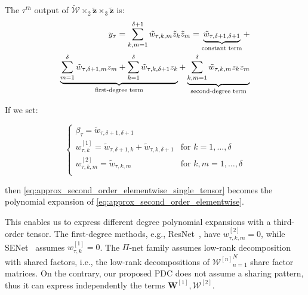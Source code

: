 \documentclass[runningheads]{llncs}
\newcommand{\resnet}{ResNet}
\newcommand{\sne}{SENet}
\newcommand{\noshare}{PDC}
\providecommand{\bmcal}[1]{\bm{\mathcal{#1}}}
\providecommand{\invar}{z}
\providecommand{\binvar}{\bm{\invar}}
\begin{document}
The $\tau^{th}$ output of  $\tilde{\bmcal{W}}\times_{2} \tilde{\binvar} \times_{3} \tilde{\binvar}$ is:
\begin{equation}
\centering
    \begin{split}
        y_{\tau} = \sum_{k, m=1}^{\delta + 1} \tilde{w}_{\tau, k, m} \tilde{\invar}_k \tilde{\invar}_m = \underbrace{\tilde{w}_{\tau, \delta + 1, \delta + 1}}_{\text{constant term}} + \\
        \underbrace{\sum_{m=1}^{\delta} \tilde{w}_{\tau, \delta + 1, m} \invar_m + \sum_{k=1}^{\delta} \tilde{w}_{\tau, k, \delta + 1} \invar_k}_{\text{first-degree term}} + 
        \underbrace{\sum_{k, m = 1}^{\delta} \tilde{w}_{\tau, k, m} \invar_k \invar_m}_{\text{second-degree term}}
    \end{split}
    \label{eq:approx_second_order_elementwise_single_tensor}
\end{equation}


If we set: 

\begin{equation}
    \begin{cases}
        \beta_{\tau} =  \tilde{w}_{\tau, \delta + 1, \delta + 1} & \\ 
        w^{[1]}_{\tau, k} =  \tilde{w}_{\tau, \delta + 1,k } + \tilde{w}_{\tau, k, \delta + 1}  & \text{for } k = 1, \dots, \delta \\ 
        w^{[2]}_{\tau, k, m} =  \tilde{w}_{\tau, k, m}  & \text{for } k, m = 1, \dots, \delta \\ 
    \end{cases}
\end{equation}

then \eqref{eq:approx_second_order_elementwise_single_tensor} becomes the polynomial expansion of \eqref{eq:approx_second_order_elementwise}. 

This enables us to express different degree polynomial expansions with a third-order tensor. The first-degree methods, e.g., \resnet~\cite{he2015deep}, have $w^{[2]}_{\tau, k, m}=0$, while \sne~\cite{hu2018squeeze} assumes $w^{[1]}_{\tau, k}=0$. The ${\Pi}$-net family assumes low-rank decomposition with shared factors, i.e., the low-rank decompositions of ${\bmcal{W}^{[n]}}_{n=1}^{N}$ share factor matrices. On the contrary, our proposed \noshare{} does not assume a sharing pattern, thus it can express independently the terms $\bm{W}^{[1]}, \bmcal{W}^{[2]}$.
\end{document}
